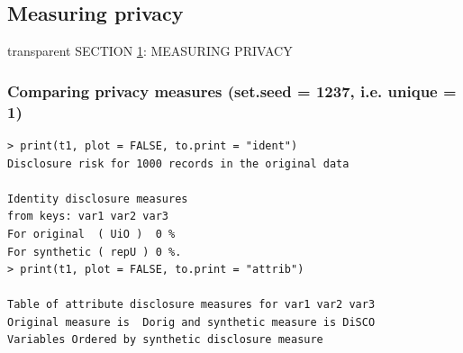 \documentclass[t,8pt,utfx8]{beamer}
\begin{document}
\begin{spacing}{1.25}
{}


\section{Measuring privacy}\label{sec:privacy}
\begin{frame}[c,plain]
\vskip-4mm
\begin{beamercolorbox}[wd=\boxwidth,ht=22.11mm]{transparent}%
    \vfill%
    \leftinsert%
    \MakeUppercase{Section \ref{sec:privacy}: Measuring privacy
} %
\end{beamercolorbox}
\vskip-3mm

\end{frame}



\begin{frame}[fragile]
\frametitle{Comparing privacy measures (set.seed = 1237, i.e. unique = 1)}
  


\begin{minipage}[t]{0.48\textwidth}
\begin{lstlisting}
> print(t1, plot = FALSE, to.print = "ident")
Disclosure risk for 1000 records in the original data

Identity disclosure measures
from keys: var1 var2 var3 
For original  ( UiO )  0 %
For synthetic ( repU ) 0 %.
> print(t1, plot = FALSE, to.print = "attrib")

Table of attribute disclosure measures for var1 var2 var3 
Original measure is  Dorig and synthetic measure is DiSCO 
Variables Ordered by synthetic disclosure measure


\end{lstlisting}
\end{minipage}
\end{frame}
\end{spacing}
\end{document}
